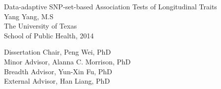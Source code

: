 \documentclass[12pt]{article}
\begin{document}
\newpage
\thispagestyle{empty}
\doublespacing
\begin{center}
{\normalsize  Data-adaptive SNP-set-based Association Tests of Longitudinal Traits}\\[2.3cm]
\singlespacing
Yang Yang, M.S\\
The University of Texas\\
School of Public Health, 2014
\end{center}

\doublespacing
\noindent
Dissertation Chair, Peng Wei, PhD\\
Minor Advisor, Alanna C. Morrison, PhD\\ 
Breadth Advisor, Yun-Xin Fu, PhD \\
External Advisor, Han Liang, PhD\\



\newpage
\tableofcontents

\newpage
\listoftables

\newpage
\listoffigures
 

\newpage
\end{document}
